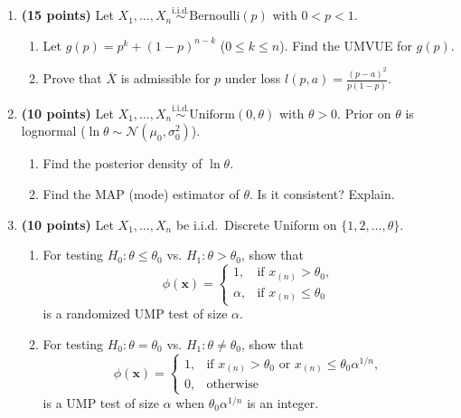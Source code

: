 \documentclass[11pt,a4paper]{article}
\begin{document}
\begin{enumerate}[label=\textbf{\arabic*.}]
    \item \textbf{(15 points)} Let $X_1, \dots, X_n \stackrel{\text{i.i.d.}}{\sim} \mathrm{Bernoulli}(p)$ with $0 < p < 1$.
    \begin{enumerate}[label=(\alph*)]
        \item Let $g(p) = p^k + (1-p)^{n-k}$ ($0 \le k \le n$). Find the UMVUE for $g(p)$.
        \item Prove that $\overline{X}$ is admissible for $p$ under loss $l(p, a) = \frac{(p-a)^2}{p(1-p)}$.
    \end{enumerate}

    \item \textbf{(10 points)} Let $X_1, \dots, X_n \stackrel{\text{i.i.d.}}{\sim} \mathrm{Uniform}(0, \theta)$ with $\theta > 0$. Prior on $\theta$ is lognormal ($\ln\theta \sim \mathcal{N}(\mu_0, \sigma_0^2)$).
    \begin{enumerate}[label=(\alph*)]
        \item Find the posterior density of $\ln\theta$.
        \item Find the MAP (mode) estimator of $\theta$. Is it consistent? Explain.
    \end{enumerate}

    \item \textbf{(10 points)} Let $X_1, \dots, X_n$ be i.i.d.\ Discrete Uniform on $\{1, 2, \dots, \theta\}$.
    \begin{enumerate}[label=(\alph*)]
        \item For testing $H_0 : \theta \le \theta_0$ vs. $H_1 : \theta > \theta_0$, show that
        \[
        \phi(\mathbf{x}) = \begin{cases} 1, & \text{if } x_{(n)} > \theta_0, \\ \alpha, & \text{if } x_{(n)} \le \theta_0 \end{cases}
        \]
        is a randomized UMP test of size $\alpha$.
        \item For testing $H_0 : \theta = \theta_0$ vs. $H_1 : \theta \neq \theta_0$, show that
        \[
        \phi(\mathbf{x}) = \begin{cases} 1, & \text{if } x_{(n)} > \theta_0 \text{ or } x_{(n)} \le \theta_0 \alpha^{1/n}, \\ 0, & \text{otherwise} \end{cases}
        \]
        is a UMP test of size $\alpha$ when $\theta_0 \alpha^{1/n}$ is an integer.
    \end{enumerate}
\end{enumerate}
\end{document}
